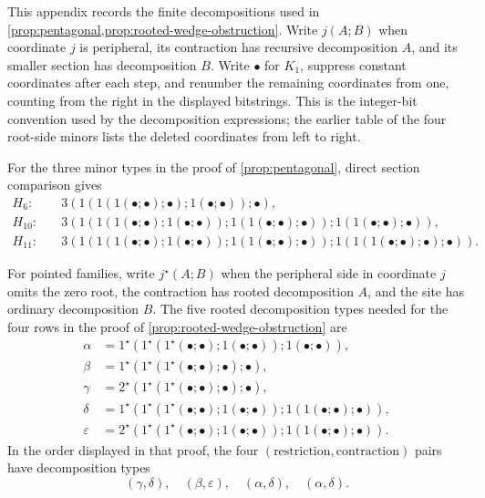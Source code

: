 \documentclass[11pt]{article}
\theoremstyle{definition}
\theoremstyle{remark}
\begin{document}
This appendix records the finite decompositions used in
\cref{prop:pentagonal,prop:rooted-wedge-obstruction}.  Write
\(j(A;B)\) when coordinate \(j\) is peripheral, its contraction has
recursive decomposition \(A\), and its smaller section has decomposition
\(B\).  Write \(\bullet\) for \(K_1\), suppress constant coordinates after
each step, and renumber the remaining coordinates from one, counting from
the right in the displayed bitstrings. This is the integer-bit convention
used by the decomposition expressions; the earlier table of the four
root-side minors lists the deleted coordinates from left to right.

For the three minor types in the proof of \cref{prop:pentagonal}, direct
section comparison gives
\begin{align*}
 H_6:\quad&3(1(1(1(\bullet;\bullet);\bullet);
                    1(\bullet;\bullet));\bullet),\\
 H_{10}:\quad&3(1(1(1(\bullet;\bullet);1(\bullet;\bullet));
                    1(1(\bullet;\bullet);\bullet));
                 1(1(\bullet;\bullet);\bullet)),\\
 H_{11}:\quad&3(1(1(1(\bullet;\bullet);1(\bullet;\bullet));
                    1(1(\bullet;\bullet);\bullet));
                 1(1(1(\bullet;\bullet);\bullet);\bullet)).
\end{align*}

For pointed families, write \(j^\star(A;B)\) when the peripheral side in
coordinate \(j\) omits the zero root, the contraction has rooted
decomposition \(A\), and the site has ordinary decomposition \(B\).  The
five rooted decomposition types needed for the four rows in the proof of
\cref{prop:rooted-wedge-obstruction} are
\begin{align*}
 \alpha&=1^\star(1^\star(1^\star(\bullet;\bullet);
                         1(\bullet;\bullet));1(\bullet;\bullet)),\\
 \beta&=1^\star(1^\star(1^\star(\bullet;\bullet);
                        \bullet);\bullet),\\
 \gamma&=2^\star(1^\star(1^\star(\bullet;\bullet);
                         \bullet);\bullet),\\
 \delta&=1^\star(1^\star(1^\star(\bullet;\bullet);
                         1(\bullet;\bullet));
                         1(1(\bullet;\bullet);\bullet)),\\
 \varepsilon&=2^\star(1^\star(1^\star(\bullet;\bullet);
                              1(\bullet;\bullet));
                              1(1(\bullet;\bullet);\bullet)).
\end{align*}
In the order displayed in that proof, the four
\((\text{restriction},\text{contraction})\) pairs have decomposition types
\[
 (\gamma,\delta),\quad(\beta,\varepsilon),\quad
 (\alpha,\delta),\quad(\alpha,\delta).
\]
\end{document}
